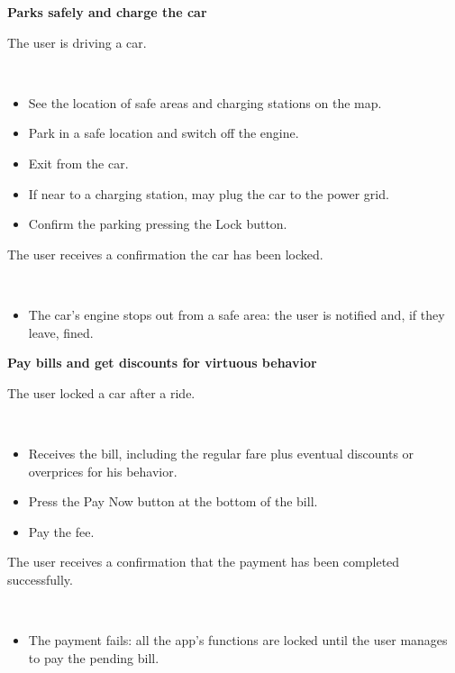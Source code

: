 \documentclass[11pt]{article} %
\begin{document}
\begin{description}[noitemsep,topsep=0pt,parsep=0pt,partopsep=0pt]
	\item[Name:] \textbf{Parks safely and charge the car}
	\item[Entry Conditions:] The user is driving a car.
	\item[Flow Of Events:] \hfill\
	\begin{itemize}
		\item See the location of safe areas and charging stations on the map.
		\item Park in a safe location and switch off the engine.
		\item Exit from the car.
		\item If near to a charging station, may plug the car to the power grid.
		\item Confirm the parking pressing the Lock button.
	\end{itemize}
	\item[Exit conditions:]  The user receives a confirmation the car has been locked.
	\item[Exceptions:] \hfill\
	\begin{itemize}
		\item The car's engine stops out from a safe area: the user is notified and, if they leave, fined.
	\end{itemize}
\end{description}

\begin{description}[noitemsep,topsep=0pt,parsep=0pt,partopsep=0pt]
	\item[Name:] \textbf{Pay bills and get discounts for virtuous behavior}
	\item[Entry Conditions:] The user locked a car after a ride.
	\item[Flow Of Events:] \hfill\
	\begin{itemize}
		\item Receives the bill, including the regular fare plus eventual discounts or overprices for his behavior.
		\item Press the Pay Now button at the bottom of the bill.
		\item Pay the fee.
	\end{itemize}
	\item[Exit conditions:]  The user receives a confirmation that the payment has been completed successfully.
	\item[Exceptions:] \hfill\
	\begin{itemize}
		\item The payment fails: all the app's functions are locked until the user manages to pay the pending bill.
	\end{itemize}
\end{description}
\end{document}
